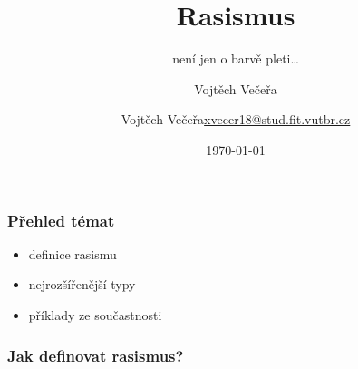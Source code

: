 \documentclass{beamer}
\begin{document}
\title{Rasismus}
\subtitle{není jen o barvě pleti\dots} 
\author{Vojtěch Večeřa}
\author{\texorpdfstring{Vojtěch Večeřa\newline\url{xvecer18@stud.fit.vutbr.cz}}{Vojtěch Večeřa}}
\date{\today}
\frame{\titlepage}

\begin{frame}
\transwipe
{}
\frametitle{Přehled témat}
\begin{itemize}
\item definice rasismu
\item nejrozšířenější typy
\item příklady ze součastnosti
\end{itemize}
\end{frame}


\begin{frame}
\transwipe
{}
\frametitle{Jak definovat rasismus?}
\begin{columns}
\begin{column}{0.6\textwidth}
\begin{itemize}
\end{itemize}
\end{column}

\begin{column}{0.4\textwidth}
\end{column}
\end{columns}
\end{frame}
\end{document}
